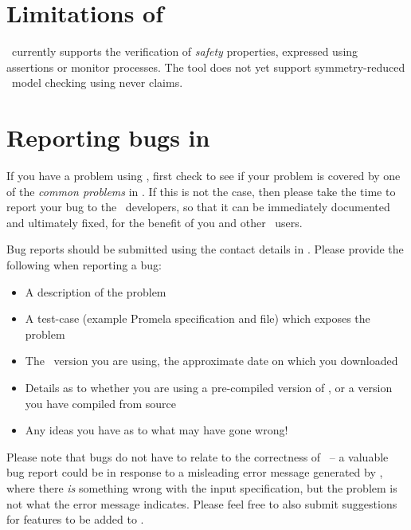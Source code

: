 

%
%
%
%

\section{Limitations of \protect\topspin}
%
\topspin\ currently supports the verification of \emph{safety}
properties, expressed using assertions or monitor processes.  The
tool does not yet support symmetry-reduced \ltl\ model checking
using never claims.
%
\section{Reporting bugs in \protect\topspin}\label{sec:troubleshooting:reportingbugs}
%
If you have a problem using \topspin, first check to see if your
problem is covered by one of the \emph{common problems} in
.  If this is not the case, then
please take the time to report your bug to the \topspin\ developers,
so that it can be immediately documented and ultimately fixed, for
the benefit of you and other \topspin\ users.

Bug reports should be submitted using the contact details in
.  Please provide the
following when reporting a bug:

\begin{itemize}
\item A description of the problem
\item A test-case (example Promela specification and  file) which exposes the problem
\item The \topspin\ version you are using, the approximate date on which you downloaded \topspin
\item Details as to whether you are using a pre-compiled version of \topspin, or a version you have compiled from source
\item Any ideas you have as to what may have gone wrong!
\end{itemize}

Please note that bugs do not have to relate to the correctness of
\topspin\ -- a valuable bug report could be in response to a
misleading error message generated by \topspin, where there
\emph{is} something wrong with the input specification, but the
problem is not what the error message indicates.  Please feel free
to also submit suggestions for features to be added to \topspin.


